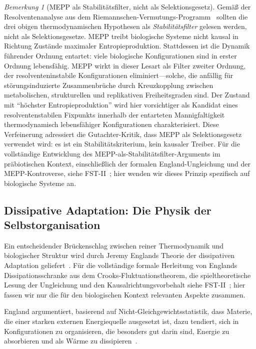 \documentclass[12pt,a4paper]{article}
\theoremstyle{remark}
\newtheorem{remark}{Bemerkung}
\begin{document}
\begin{remark}[MEPP als Stabilitätsfilter, nicht als Selektionsgesetz]
\label{rem:mepp-stability-biology}
Gemäß der Resolventenanalyse aus dem Riemannschen-Vermutungs-Programm~\citep{GeigerRH2026b} sollten die drei obigen thermodynamischen Hypothesen als \emph{Stabilitätsfilter} gelesen werden, nicht als Selektionsgesetze. MEPP treibt biologische Systeme nicht kausal in Richtung Zustände maximaler Entropieproduktion. Stattdessen ist die Dynamik führender Ordnung entartet: viele biologische Konfigurationen sind in erster Ordnung lebensfähig. MEPP wirkt in dieser Lesart als Filter zweiter Ordnung, der resolventeninstabile Konfigurationen eliminiert---solche, die anfällig für störungsinduzierte Zusammenbrüche durch Kreuzkopplung zwischen metabolischen, strukturellen und replikativen Freiheitsgraden sind. Der Zustand mit ``höchster Entropieproduktion'' wird hier vorsichtiger als Kandidat eines resolventenstabilen Fixpunkts innerhalb der entarteten Mannigfaltigkeit thermodynamisch lebensfähiger Konfigurationen charakterisiert. Diese Verfeinerung adressiert die Gutachter-Kritik, dass MEPP als Selektionsgesetz verwendet wird: es ist ein Stabilitätskriterium, kein kausaler Treiber. Für die vollständige Entwicklung des MEPP-als-Stabilitätsfilter-Arguments im präbiotischen Kontext, einschließlich der formalen England-Ungleichung und der MEPP-Kontroverse, siehe FST-II~\citep{FSTII}; hier wenden wir dieses Prinzip spezifisch auf biologische Systeme an.
\end{remark}

\subsection{Dissipative Adaptation: Die Physik der Selbstorganisation}

Ein entscheidender Brückenschlag zwischen reiner Thermodynamik und biologischer Struktur wird durch Jeremy Englands Theorie der dissipativen Adaptation geliefert~\citep{England2013,EnglandNano}. Für die vollständige formale Herleitung von Englands Dissipationsschranke aus dem Crooks-Fluktuationstheorem, die spieltheoretische Lesung der Ungleichung und den Kausalrichtungsvorbehalt siehe FST-II~\citep{FSTII}; hier fassen wir nur die für den biologischen Kontext relevanten Aspekte zusammen.

England argumentiert, basierend auf Nicht-Gleichgewichtsstatistik, dass Materie, die einer starken externen Energiequelle ausgesetzt ist, dazu tendiert, sich in Konfigurationen zu organisieren, die besonders gut darin sind, Energie zu absorbieren und als Wärme zu dissipieren~\citep{England2013}.
\end{document}
